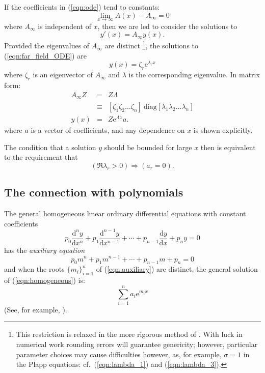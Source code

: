 \documentclass{article}
\begin{document}
If the coefficients in (\ref{eqn:ode}) tend to constants:
\begin{equation}
\lim_{x\rightarrow\infty} A(x)-A_\infty = 0
\end{equation}
where $A_\infty$ is independent of $x$, then we are led to consider
the solutions to 
\begin{equation}
y'(x) = A_\infty y(x).
\label{eqn:far_field_ODE}
\end{equation}
Provided the eigenvalues of $A_\infty$ are distinct \footnote{This
restriction is relaxed in the more rigorous method of
\citet{Lentini80:SINUM-17-577}.  With luck in numerical work rounding
errors will guarantee genericity; however, particular parameter
choices may cause difficulties however, as, for example, $\sigma=1$ in
the Plapp equations: cf.\ (\ref{eqn:lambda_1}) and
(\ref{eqn:lambda_3}).}, the solutions to (\ref{eqn:far_field_ODE}) are
\begin{equation}
y(x) = \zeta_r \mathrm{e}^{\lambda_r x}
\end{equation}
where $\zeta_r$ is an eigenvector of $A_\infty$ and $\lambda$ is the
corresponding eigenvalue.  In matrix form:
\begin{eqnarray}
A_\infty Z & = & Z\Lambda
\label{eqn:eigenvalue} \\
& \equiv & [\zeta_1 \zeta_2 \ldots \zeta_n]
        \:\mathrm{diag}[\lambda_1 \lambda_2 \ldots \lambda_n] \\
y(x) & = & Z \mathrm{e}^{\Lambda x} a.
\label{eqn:general_far_field_solution}
\end{eqnarray}
where $a$ is a vector of coefficients, and any dependence on $x$ is
shown explicitly.

The condition that a solution $y$ should be bounded for large $x$ then
is equivalent to the requirement that
\begin{equation}
(\Re \lambda_r > 0) \Rightarrow (a_r = 0).
\end{equation}

\subsection{The connection with polynomials}

The general homogeneous linear ordinary differential equations with
constant coefficients
\begin{equation}
p_0 \frac{\mathrm{d}^n y}{\mathrm{d}x^n}
+ p_1 \frac{\mathrm{d}^{n-1} y}{\mathrm{d}x^{n-1}}
+ \cdots
+ p_{n-1} \frac{\mathrm{d} y}{\mathrm{d}x}
+ p_{n} y = 0
\label{eqn:homogeneous}
\end{equation}
has the \textit{auxiliary equation}
\begin{equation}
p_0 m^n
+ p_1 m^{n-1}
+ \cdots
+ p_{n-1} m
+ p_{n} = 0
\label{eqn:auxiliary}
\end{equation}
and when the roots $\{m_i\}_{i=1}^n$ of (\ref{eqn:auxiliary}) are
distinct, the general solution of (\ref{eqn:homogeneous}) is:
\begin{equation}
\sum_{i=1}^n a_i \mathrm{e}^{m_i x}
\label{eqn:general_solution}
\end{equation}
(See, for example, \citealp[ch.~3]{Piaggio65:ETD}).
\end{document}

